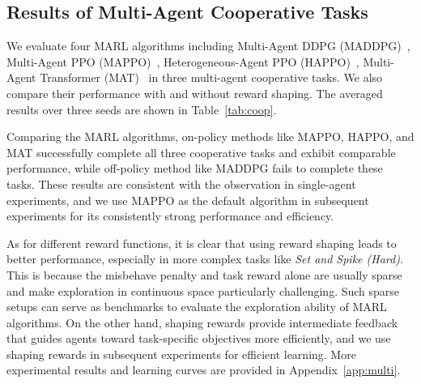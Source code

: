 \subsection{Results of Multi-Agent Cooperative Tasks}

We evaluate four MARL algorithms including Multi-Agent DDPG (MADDPG)~\cite{lowe2017multi}, Multi-Agent PPO (MAPPO)~\cite{yu2022surprising}, Heterogeneous-Agent PPO (HAPPO)~\cite{kuba2021trust}, Multi-Agent Transformer (MAT)~\cite{wen2022multi} in three multi-agent cooperative tasks. We also compare their performance with and without reward shaping. The averaged results over three seeds are shown in Table~\ref{tab:coop}.

Comparing the MARL algorithms, on-policy methods like MAPPO, HAPPO, and MAT successfully complete all three cooperative tasks and exhibit comparable performance, while off-policy method like MADDPG fails to complete these tasks. These results are consistent with the observation in single-agent experiments, and we use MAPPO as the default algorithm in subsequent experiments for its consistently strong performance and efficiency.

As for different reward functions, it is clear that using reward shaping leads to better performance, especially in more complex tasks like \textit{Set and Spike (Hard)}. This is because the misbehave penalty and task reward alone are usually sparse and make exploration in continuous space particularly challenging. Such sparse setups can serve as benchmarks to evaluate the exploration ability of MARL algorithms. On the other hand, shaping rewards provide intermediate feedback that guides agents toward task-specific objectives more efficiently, and we use shaping rewards in subsequent experiments for efficient learning. More experimental results and learning curves are provided in Appendix~\ref{app:multi}.




